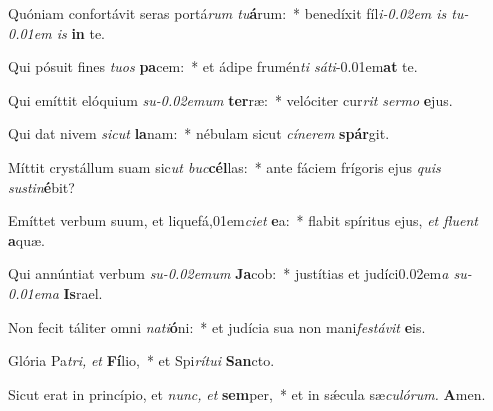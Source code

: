 \item Quóniam confortávit seras portá\textit{rum tu}\textbf{á}rum:~* benedíxit fíl\textit{i\kern -0.02em is tu\kern -0.01em is} \textbf{in} te.
\item Qui pósuit fines \textit{tuos} \textbf{pa}cem:~* et ádipe frumén\textit{ti sáti}\kern -0.01em\textbf{at} te.
\item Qui emíttit elóquium \textit{su\kern -0.02emum} \textbf{ter}ræ:~* velóciter cur\textit{rit sermo} \textbf{e}jus.
\item Qui dat nivem \textit{sicut} \textbf{la}nam:~* nébulam sicut \textit{cínerem} \textbf{spár}git.
\item Míttit crystállum suam sic\textit{ut buc}\textbf{cél}las:~* ante fáciem frígoris ejus \textit{quis sustin}\textbf{é}bit?
\item Emíttet verbum suum, et liquefá,01em\textit{ciet} \textbf{e}a:~* flabit spíritus ejus, \textit{et fluent} \textbf{a}quæ.
\item Qui annúntiat verbum \textit{su\kern-0.02emum} \textbf{Ja}cob:~* justítias et judíci\kern 0.02em\textit{a su\kern -0.01ema} \textbf{Is}rael.
\item Non fecit táliter omni \textit{nati}\textbf{ó}ni:~* et judícia sua non mani\textit{festávit} \textbf{e}is.
\item Glória Pa\tinyhspace\textit{tri,} \textit{et} \textbf{Fí}lio,~* et Spi\tinyhspace\textit{rítui} \textbf{San}cto.
\item Sicut erat in princípio, et \textit{nunc,} \textit{et} \textbf{sem}per,~* et in sǽcula sæ\tinyhspace\textit{culórum.} \textbf{A}men.